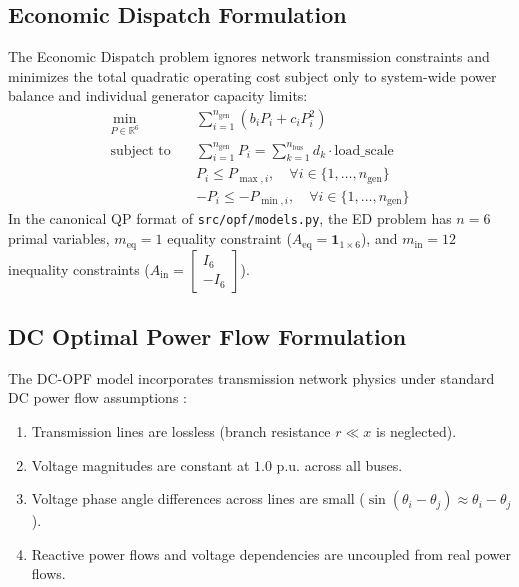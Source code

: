 \subsection{Economic Dispatch Formulation}
The Economic Dispatch problem ignores network transmission constraints and minimizes the total quadratic operating cost subject only to system-wide power balance and individual generator capacity limits:
\begin{align}
    \min_{P \in \mathbb{R}^6} \quad & \sum_{i=1}^{n_{\text{gen}}} \left( b_i P_i + c_i P_i^2 \right) \label{eq:ed_obj} \\
    \text{subject to} \quad & \sum_{i=1}^{n_{\text{gen}}} P_i = \sum_{k=1}^{n_{\text{bus}}} d_k \cdot \text{load\_scale} \label{eq:ed_balance} \\
    & P_i \le P_{\max, i}, \quad \forall i \in \{1, \dots, n_{\text{gen}}\} \label{eq:ed_pmax} \\
    & -P_i \le -P_{\min, i}, \quad \forall i \in \{1, \dots, n_{\text{gen}}\} \label{eq:ed_pmin}
\end{align}
In the canonical QP format of \texttt{src/opf/models.py}, the ED problem has $n = 6$ primal variables, $m_{\text{eq}} = 1$ equality constraint ($A_{\text{eq}} = \mathbf{1}_{1 \times 6}$), and $m_{\text{in}} = 12$ inequality constraints ($A_{\text{in}} = \begin{bmatrix} I_6 \\ -I_6 \end{bmatrix}$).

\subsection{DC Optimal Power Flow Formulation}
The DC-OPF model incorporates transmission network physics under standard DC power flow assumptions \cite{wood2014}:
\begin{enumerate}
    \item Transmission lines are lossless (branch resistance $r \ll x$ is neglected).
    \item Voltage magnitudes are constant at $1.0\text{ p.u.}$ across all buses.
    \item Voltage phase angle differences across lines are small ($\sin(\theta_i - \theta_j) \approx \theta_i - \theta_j$).
    \item Reactive power flows and voltage dependencies are uncoupled from real power flows.
\end{enumerate}

